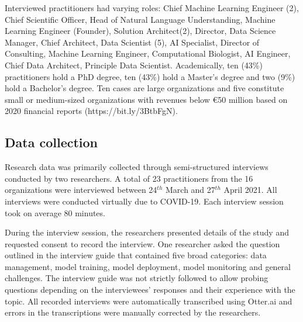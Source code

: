 Interviewed practitioners had varying roles: Chief Machine Learning Engineer (2), Chief Scientific Officer, Head of Natural Language Understanding,  Machine Learning Engineer (Founder), Solution Architect(2), Director, Data Science Manager, Chief Architect, Data Scientist (5), AI Specialist, Director of Consulting, Machine Learning Engineer, Computational Biologist, AI Engineer, Chief Data Architect, Principle Data Scientist.
Academically, ten (43\%) practitioners hold a PhD degree, ten (43\%) hold a Master's degree and two (9\%) hold a Bachelor's degree. %
%
Ten cases are large organizations and five constitute small or medium-sized organizations with revenues below €50 million based on 2020 financial reports (https://bit.ly/3BtbFgN).

\subsection{Data collection}

Research data was primarily collected through semi-structured interviews conducted by two researchers. A total of 23 practitioners from the 16 organizations were interviewed between 24$^{th}$ March and 27$^{th}$ April 2021. All interviews were conducted virtually due to COVID-19. Each interview session took on average 80 minutes. 

During the interview session, the researchers presented details of the study and requested consent to record the interview. One researcher asked the question outlined in the interview guide that contained five broad categories: data management, model training, model deployment, model monitoring and general challenges. The interview guide was not strictly followed to allow probing questions depending on the interviewees' responses and their experience with the topic. All recorded interviews were automatically transcribed using Otter.ai and errors in the transcriptions were manually corrected by the researchers.  %


